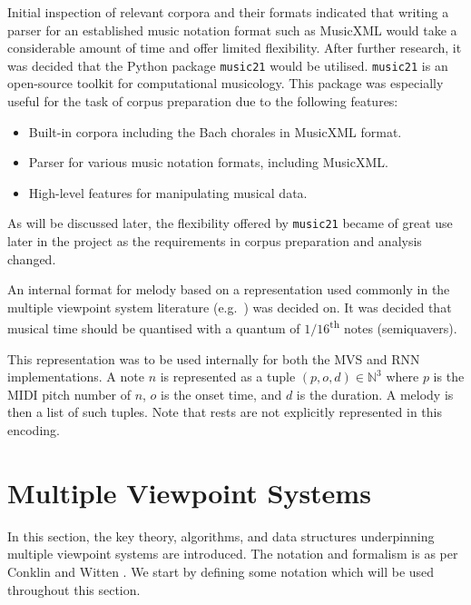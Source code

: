 \documentclass[12pt,a4paper,twoside,openright]{report}
\begin{document}
Initial inspection of relevant corpora and their formats indicated that writing
a parser for an established music notation format such as MusicXML would take a
considerable amount of time and offer limited flexibility. After further
research, it was decided that the Python package \texttt{music21} would be
utilised. \texttt{music21} is an open-source toolkit for computational
musicology. This package was especially useful for the task of corpus
preparation due to the following features:
\begin{itemize}
  \item Built-in corpora including the Bach chorales in MusicXML format.
  \item Parser for various music notation formats, including MusicXML.
  \item High-level features for manipulating musical data.
\end{itemize}

As will be discussed later, the flexibility offered by \texttt{music21} became
of great use later in the project as the requirements in corpus preparation and
analysis changed.

An internal format for melody based on a representation used commonly in the
multiple viewpoint system literature (e.g.\ \cite{conklin1995viewpoints}) was
decided on. It was decided that musical time should be quantised with a quantum
of $1/16$\textsuperscript{th} notes (semiquavers). 

This representation was to be used internally for both the MVS and
RNN implementations. A note $n$ is represented as a tuple $(p,o,d) \in
\mathbb{N}^3$ where $p$ is the MIDI pitch number of $n$, $o$ is the onset 
time, and $d$ is the duration. A melody is then a list of such tuples. Note that
rests are not explicitly represented in this encoding.

\section{Multiple Viewpoint Systems}

In this section, the key theory, algorithms, and data structures underpinning
multiple viewpoint systems are introduced. The notation and formalism is as per
Conklin and Witten \cite{conklin1995viewpoints}. We start by defining some
notation which will be used throughout this section.
\end{document}

